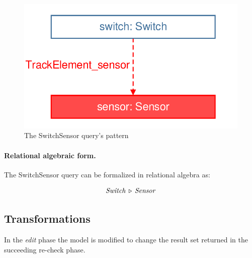 \begin{figure}[Htb]
		\centering
		\includegraphics[scale=0.4]{figures/trainbenchmark-switchsensor}
		\caption{The \textsf{SwitchSensor} query's pattern}
		\label{fig:trainbenchmark-switchsensor}
\end{figure}

\paragraph{Relational algebraic form.} The \textsf{SwitchSensor} query can be formalized in relational algebra as:

$$ \mathit{Switch} \, \triangleright \, \mathit{Sensor} $$


\subsection{Transformations}
\label{sec:transformatios}

In the \emph{edit} phase the model is modified to change the result set returned in the succeeding re-check phase.


